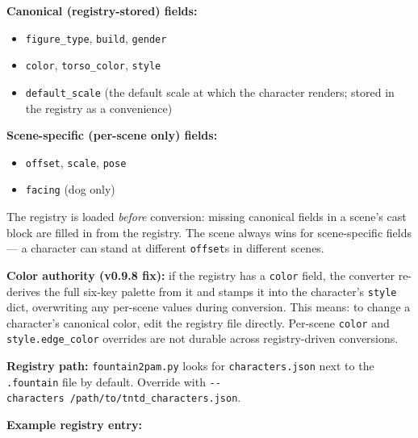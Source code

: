 \documentclass[
  11pt,
]{book}
\providecommand{\tightlist}{%
  \setlength{\itemsep}{0pt}\setlength{\parskip}{0pt}}
\begin{document}
\textbf{Canonical (registry-stored) fields:}

\begin{itemize}
\tightlist
\item
  \texttt{figure\_type}, \texttt{build}, \texttt{gender}
\item
  \texttt{color}, \texttt{torso\_color}, \texttt{style}
\item
  \texttt{default\_scale} (the default scale at which the character
  renders; stored in the registry as a convenience)
\end{itemize}

\textbf{Scene-specific (per-scene only) fields:}

\begin{itemize}
\tightlist
\item
  \texttt{offset}, \texttt{scale}, \texttt{pose}
\item
  \texttt{facing} (dog only)
\end{itemize}

The registry is loaded \emph{before} conversion: missing canonical
fields in a scene's cast block are filled in from the registry. The
scene always wins for scene-specific fields --- a character can stand at
different \texttt{offset}s in different scenes.

\textbf{Color authority (v0.9.8 fix):} if the registry has a
\texttt{color} field, the converter re-derives the full six-key palette
from it and stamps it into the character's \texttt{style} dict,
overwriting any per-scene values during conversion. This means: to
change a character's canonical color, edit the registry file directly.
Per-scene \texttt{color} and \texttt{style.edge\_color} overrides are
not durable across registry-driven conversions.

\textbf{Registry path:} \texttt{fountain2pam.py} looks for
\texttt{characters.json} next to the \texttt{.fountain} file by default.
Override with \texttt{-\/-characters\ /path/to/tntd\_characters.json}.

\textbf{Example registry entry:}
\end{document}

